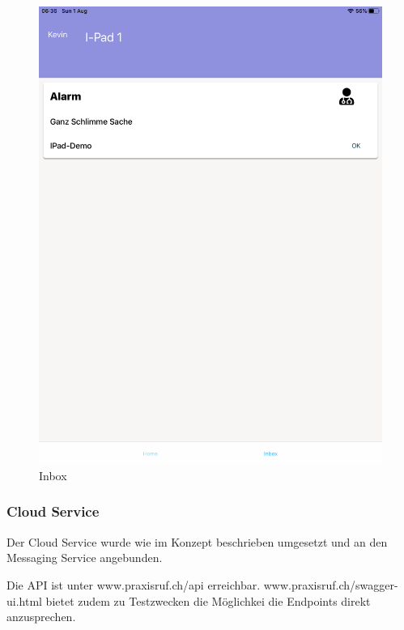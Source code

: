 \begin{figure}[h]
\begin{minipage}[b]{0.4\textwidth}
        \includegraphics[width=\textwidth]{graphics/screenshots/mobileclient/screenshots-inbox}
        \caption{Inbox}
    \end{minipage}
    \label{fig:MobileClient-Screens2}
\end{figure}

\clearpage

\subsubsection{Cloud Service}

Der Cloud Service wurde wie im Konzept beschrieben umgesetzt und an den Messaging Service angebunden.

Die API ist unter www.praxisruf.ch/api erreichbar.
www.praxisruf.ch/swagger-ui.html bietet zudem zu Testzwecken die Möglichkei die Endpoints direkt anzusprechen.

